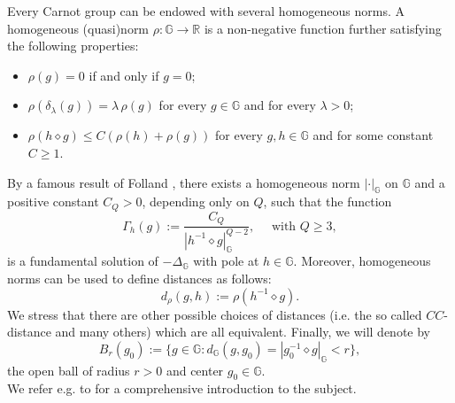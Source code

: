 \documentclass[11pt]{amsart}
\numberwithin{equation}{section} %
\theoremstyle{definition}
\begin{document}
\medskip

Every Carnot group can be endowed with several homogeneous norms. A homogeneous (quasi)norm $\rho : \mathbb{G} \to \mathbb{R}$ is a non-negative function further satisfying the following properties:
\begin{itemize}
	\item $\rho(g)=0$ if and only if $g=0$;
	\item $\rho(\delta_{\lambda}(g)) = \lambda \, \rho(g)$ for every $g \in \mathbb{G}$ and for every $\lambda >0$;
	\item $\rho(h\diamond g) \leq C \left(\rho(h) + \rho(g)\right)$ for every $g,h \in \mathbb{G}$ and for some constant $C \geq 1$.
\end{itemize}
By a famous result of Folland \cite{Folland}, there exists a homogeneous norm $|\cdot|_{\mathbb{G}}$ on $\mathbb{G}$ and a positive constant $C_Q>0$, depending only on $Q$, such that the function
\begin{equation}\label{eq:def_Gamma}
	\Gamma_{h}(g):= \dfrac{C_Q}{|h^{-1}\diamond g|^{Q-2}_{\mathbb{G}}}, \quad \textrm{ with } Q \geq 3,
\end{equation}
\noindent is a fundamental solution of $-\Delta_{\mathbb{G}}$ with pole at $h \in \mathbb{G}$.
Moreover, homogeneous norms can be used to define distances as follows: 
\begin{equation*}
	d_{\rho}(g,h):= \rho(h^{-1}\diamond g).
\end{equation*}
We stress that there are other possible choices of distances (i.e. the so called $CC$-distance and many others) which are all equivalent.
%
%
Finally, we will denote by 
\begin{equation*}
	B_{r}(g_0) := \{ g \in \mathbb{G}: d_{\mathbb{G}}(g,g_0) = |g_{0}^{-1}\diamond g|_{\mathbb{G}} <r\},
\end{equation*} 
\noindent the open ball of radius $r>0$ and center $g_{0}\in \mathbb{G}$.\\
We refer e.g. to \cite{BLU} for a comprehensive introduction to the subject.
\end{document}
